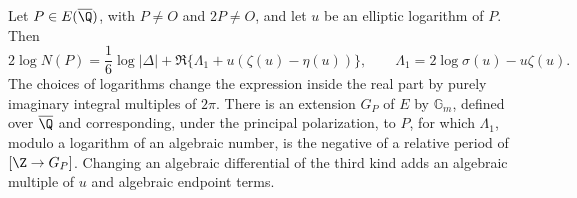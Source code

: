 \begin{statement}
Let $P\in E(\overline\Q)$, with $P\ne O$ and $2P\ne O$, and
let $u$ be an elliptic logarithm of $P$. Then
\begin{equation}\label{eq:cp-sigma}
 2\log N(P)=\frac16\log|\Delta|
       +\Re\{\Lambda_1+u(\zeta(u)-\eta(u))\},
 \qquad \Lambda_1=2\log\sigma(u)-u\zeta(u).
\end{equation}
The choices of logarithms change the expression inside the real
part by purely imaginary integral multiples of $2\pi$.
There is an extension $G_P$ of $E$ by $\mathbb G_m$, defined
over $\overline\Q$ and corresponding, under the principal
polarization, to $P$, for which $\Lambda_1$, modulo a logarithm
of an algebraic number, is the negative of a relative period
of $[\Z\to G_P]$. Changing an algebraic differential of the
third kind adds an algebraic multiple of $u$ and algebraic
endpoint terms.
\end{statement}
